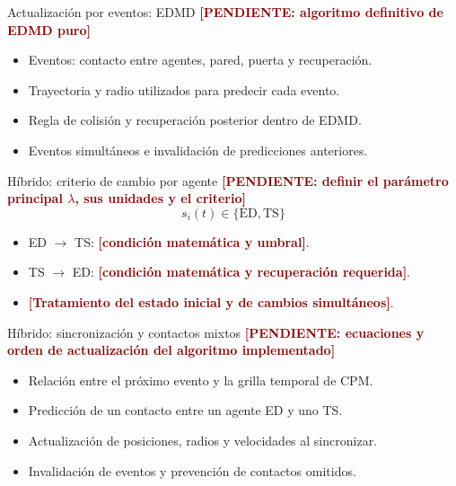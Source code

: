 \documentclass[aspectratio=169,20pt]{beamer}
\newcommand{\pendiente}[1]{\textcolor{darkred}{\textbf{[PENDIENTE: #1]}}}
\newcommand{\dato}[1]{\textcolor{darkred}{\textbf{[#1]}}}
\begin{document}
	\begin{frame}{Actualización por eventos: EDMD}
		\pendiente{algoritmo definitivo de EDMD puro}
		\begin{itemize}
			\item Eventos: contacto entre agentes, pared, puerta y recuperación.
			\item Trayectoria y radio utilizados para predecir cada evento.
			\item Regla de colisión y recuperación posterior dentro de EDMD.
			\item Eventos simultáneos e invalidación de predicciones anteriores.
		\end{itemize}
	\end{frame}
	
	\begin{frame}{Híbrido: criterio de cambio por agente}
		\pendiente{definir el parámetro principal $\lambda$, sus unidades y el criterio}
		\[
		s_i(t)\in\{\mathrm{ED},\mathrm{TS}\}
		\]
		\begin{itemize}
			\item ED $\rightarrow$ TS: \dato{condición matemática y umbral}.
			\item TS $\rightarrow$ ED: \dato{condición matemática y recuperación requerida}.
			\item \dato{Tratamiento del estado inicial y de cambios simultáneos}.
		\end{itemize}
	\end{frame}
	
	\begin{frame}{Híbrido: sincronización y contactos mixtos}
		\pendiente{ecuaciones y orden de actualización del algoritmo implementado}
		\begin{itemize}
			\item Relación entre el próximo evento y la grilla temporal de CPM.
			\item Predicción de un contacto entre un agente ED y uno TS.
			\item Actualización de posiciones, radios y velocidades al sincronizar.
			\item Invalidación de eventos y prevención de contactos omitidos.
		\end{itemize}
	\end{frame}
	
\end{document}
